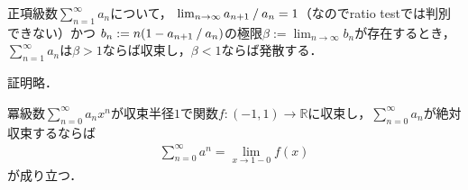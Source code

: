 \documentclass[../main.tex]{subfiles}
\begin{document}

\begin{thmbox}
\begin{theorem}
正項級数\(\sum_{n = 1}^\infty a_n\)について，
\(\lim_{n\to \infty} a_{n + 1}\mathbin{/}a_n = 1\)（なのでratio testでは判別できない）かつ
\(b_n := n(1 - a_{n + 1}\mathbin{/}a_n)\)の極限\(\beta := \lim_{n \to \infty} b_n\)が存在するとき，
\(\sum_{n = 1}^\infty a_n\)は\(\beta > 1\)ならば収束し，\(\beta < 1\)ならば発散する．
\end{theorem}
\end{thmbox}


証明略．


\begin{thmbox}
\begin{theorem}
冪級数\(\sum_{n = 0}^\infty a_n x^n\)が収束半径\(1\)で関数\(f\colon (-1, 1) \to \mathbb{R}\)に収束し，\(\sum_{n = 0}^\infty a_n\)が絶対収束するならば
\begin{align}
  \sum_{n = 0}^\infty a^n = \lim_{x \to 1 - 0}f(x)
\end{align}
が成り立つ．
\end{theorem}
\end{thmbox}

\end{document}
